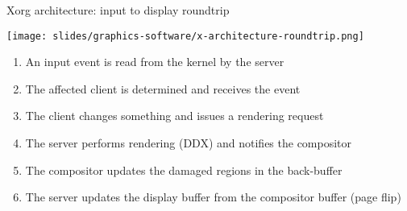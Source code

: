 \begin{frame}{Xorg architecture: input to display roundtrip}
  \begin{minipage}{0.49\textwidth}
    \centering
    \texttt{[image: slides/graphics-software/x-architecture-roundtrip.png]}
  \end{minipage}
  \hfill
  \begin{minipage}{0.49\textwidth}
    \begin{enumerate}
    \item An input event is read from the kernel by the server
    \item The affected client is determined and receives the event
    \item The client changes something and issues a rendering request
    \item The server performs rendering (DDX) and notifies the compositor
    \item The compositor updates the damaged regions in the back-buffer
    \item The server updates the display buffer from the compositor buffer (page flip)
    \end{enumerate}
  \end{minipage}
\end{frame}

